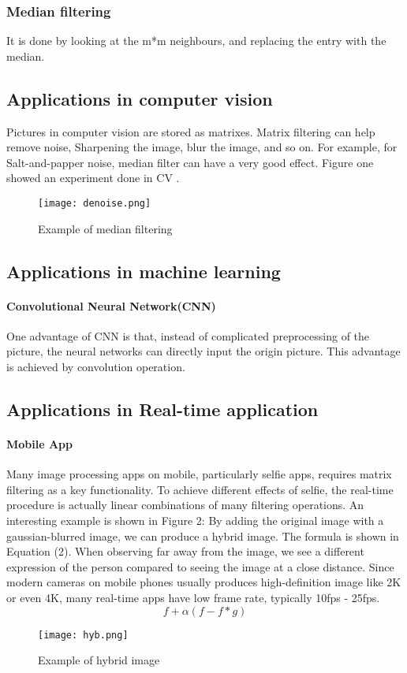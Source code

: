 \documentclass[letterpaper, 10 pt, conference]{ieeeconf}  %
\begin{document}
\subsubsection{Median filtering} It is done by looking at the m*m neighbours, and replacing the entry with the median.
\subsection{Applications in computer vision}
Pictures in computer vision are stored as matrixes. Matrix filtering can help remove noise, Sharpening the image, blur the image, and so on. For example, for Salt-and-papper noise, median filter can have a very good effect. Figure one showed an experiment done in CV \cite{c1}.
\begin{figure}
  \centering
	\texttt{[image: denoise.png]}
  \caption{Example of median filtering}\label{fig:digit}
\end{figure}
\subsection{Applications in machine learning}
\paragraph{Convolutional Neural Network(CNN)}
One advantage of CNN is that, instead of complicated preprocessing of the picture, the neural networks can directly input the origin picture. This advantage is achieved by convolution operation.
\subsection{Applications in Real-time application}
\paragraph{Mobile App}
Many image processing apps on mobile, particularly selfie apps, requires matrix filtering as a key functionality. To achieve different effects of selfie, the real-time procedure is actually linear combinations of many filtering operations. An interesting example is shown in Figure 2: By adding the original image with a gaussian-blurred image, we can produce a hybrid image\cite{c2}. The formula is shown in Equation (2). When observing far away from the image, we see a different expression of the person compared to seeing the image at a close distance.  Since modern cameras on mobile phones usually produces high-definition image like 2K or even 4K, many real-time apps have low frame rate, typically 10fps - 25fps.
\begin{equation}
	f + \alpha(f - f*g)
\end{equation}
\begin{figure}
  \centering
	\texttt{[image: hyb.png]}
  \caption{Example of hybrid image}\label{fig:digit}
\end{figure}
\end{document}
